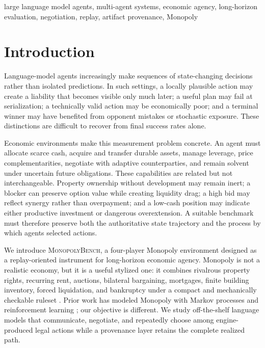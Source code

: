 \documentclass[conference]{IEEEtran}
\newcommand{\Bench}{\textsc{MonopolyBench}\xspace}
\begin{document}
\begin{IEEEkeywords}
large language model agents, multi-agent systems, economic agency, long-horizon evaluation, negotiation, replay, artifact provenance, Monopoly
\end{IEEEkeywords}

\section{Introduction}
\label{sec:intro}

Language-model agents increasingly make sequences of state-changing decisions rather than isolated predictions. In such settings, a locally plausible action may create a liability that becomes visible only much later; a useful plan may fail at serialization; a technically valid action may be economically poor; and a terminal winner may have benefited from opponent mistakes or stochastic exposure. These distinctions are difficult to recover from final success rates alone.

Economic environments make this measurement problem concrete. An agent must allocate scarce cash, acquire and transfer durable assets, manage leverage, price complementarities, negotiate with adaptive counterparties, and remain solvent under uncertain future obligations. These capabilities are related but not interchangeable. Property ownership without development may remain inert; a blocker can preserve option value while creating liquidity drag; a high bid may reflect synergy rather than overpayment; and a low-cash position may indicate either productive investment or dangerous overextension. A suitable benchmark must therefore preserve both the authoritative state trajectory and the process by which agents selected actions.

We introduce \Bench, a four-player Monopoly environment designed as a replay-oriented instrument for long-horizon economic agency. Monopoly is not a realistic economy, but it is a useful stylized one: it combines rivalrous property rights, recurring rent, auctions, bilateral bargaining, mortgages, finite building inventory, forced liquidation, and bankruptcy under a compact and mechanically checkable ruleset \cite{hasbro_rules}. Prior work has modeled Monopoly with Markov processes and reinforcement learning \cite{ash_bishop,bonjour_monopoly}; our objective is different. We study off-the-shelf language models that communicate, negotiate, and repeatedly choose among engine-produced legal actions while a provenance layer retains the complete realized path.
\end{document}
